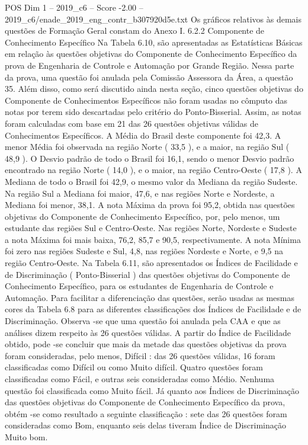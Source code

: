 \begin{textsample}{POS Dim 1 – 2019\_c6 – Score -2.00 – 2019\_c6/enade\_2019\_eng\_contr\_b307920d5e.txt}
Os gráficos relativos às demais questões de Formação Geral constam do Anexo I. 6.2.2 Componente de Conhecimento Específico Na Tabela 6.10, são apresentadas as Estatísticas Básicas em relação às questões objetivas do Componente de Conhecimento Específico da prova de Engenharia de Controle e Automação por Grande Região.
Nessa parte da prova, uma questão foi anulada pela Comissão Assessora da Área, a questão 35.
Além disso, como será discutido ainda nesta seção, cinco questões objetivas do Componente de Conhecimentos Específicos não foram usadas no cômputo das notas por terem sido descartadas pelo critério do Ponto-Bisserial.
Assim, as notas foram calculadas com base em 21 das 26 questões objetivas válidas de Conhecimentos Específicos.
A Média do Brasil deste componente foi 42,3.
A menor Média foi observada na região Norte ( 33,5 ), e a maior, na região Sul ( 48,9 ).
O Desvio padrão de todo o Brasil foi 16,1, sendo o menor Desvio padrão encontrado na região Norte ( 14,0 ), e o maior, na região Centro-Oeste ( 17,8 ).
A Mediana de todo o Brasil foi 42,9, o mesmo valor da Mediana da região Sudeste.
Na região Sul a Mediana foi maior, 47,6, e nas regiões Norte e Nordeste, a Mediana foi menor, 38,1.
A nota Máxima da prova foi 95,2, obtida nas questões objetivas do Componente de Conhecimento Específico, por, pelo menos, um estudante das regiões Sul e Centro-Oeste.
Nas regiões Norte, Nordeste e Sudeste a nota Máxima foi mais baixa, 76,2, 85,7 e 90,5, respectivamente.
A nota Mínima foi zero nas regiões Sudeste e Sul, 4,8, nas regiões Nordeste e Norte, e 9,5 na região Centro-Oeste.
Na Tabela 6.11, são apresentados os Índices de Facilidade e de Discriminação ( Ponto-Bisserial ) das questões objetivas do Componente de Conhecimento Específico, para os estudantes de Engenharia de Controle e Automação.
Para facilitar a diferenciação das questões, serão usadas as mesmas cores da Tabela 6.8 para as diferentes classificações dos Índices de Facilidade e de Discriminação.
Observa -se que uma questão foi anulada pela CAA e que as análises dizem respeito às 26 questões válidas.
A partir do Índice de Facilidade obtido, pode -se concluir que mais da metade das questões objetivas da prova foram consideradas, pelo menos, Difícil : das 26 questões válidas, 16 foram classificadas como Difícil ou como Muito difícil.
Quatro questões foram classificadas como Fácil, e outras seis consideradas como Médio.
Nenhuma questão foi classificada como Muito fácil.
Já quanto aos Índices de Discriminação das questões objetivas do Componente de Conhecimento Específico da prova, obtém -se como resultado a seguinte classificação : sete das 26 questões foram consideradas como Bom, enquanto seis delas tiveram Índice de Discriminação Muito bom.

\end{textsample}
